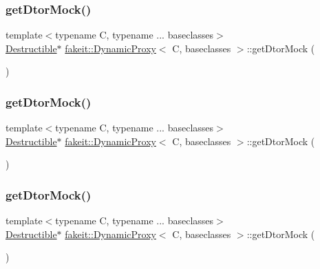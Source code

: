 \subsubsection{\texorpdfstring{getDtorMock()}{getDtorMock()}\hspace{0.1cm}{\footnotesize\ttfamily [4/9]}}
{\footnotesize\ttfamily template$<$typename C, typename ... baseclasses$>$ \\
\mbox{\hyperlink{classfakeit_1_1Destructible}{Destructible}}$\ast$ \mbox{\hyperlink{structfakeit_1_1DynamicProxy}{fakeit\+::\+Dynamic\+Proxy}}$<$ C, baseclasses $>$\+::get\+Dtor\+Mock (\begin{DoxyParamCaption}{ }\end{DoxyParamCaption})\hspace{0.3cm}{\ttfamily [inline]}}

\mbox{\label{structfakeit_1_1DynamicProxy_a32f8a09734ef6d70162d682fd593707b}} 
\subsubsection{\texorpdfstring{getDtorMock()}{getDtorMock()}\hspace{0.1cm}{\footnotesize\ttfamily [5/9]}}
{\footnotesize\ttfamily template$<$typename C, typename ... baseclasses$>$ \\
\mbox{\hyperlink{classfakeit_1_1Destructible}{Destructible}}$\ast$ \mbox{\hyperlink{structfakeit_1_1DynamicProxy}{fakeit\+::\+Dynamic\+Proxy}}$<$ C, baseclasses $>$\+::get\+Dtor\+Mock (\begin{DoxyParamCaption}{ }\end{DoxyParamCaption})\hspace{0.3cm}{\ttfamily [inline]}}

\mbox{\label{structfakeit_1_1DynamicProxy_a32f8a09734ef6d70162d682fd593707b}} 
\subsubsection{\texorpdfstring{getDtorMock()}{getDtorMock()}\hspace{0.1cm}{\footnotesize\ttfamily [6/9]}}
{\footnotesize\ttfamily template$<$typename C, typename ... baseclasses$>$ \\
\mbox{\hyperlink{classfakeit_1_1Destructible}{Destructible}}$\ast$ \mbox{\hyperlink{structfakeit_1_1DynamicProxy}{fakeit\+::\+Dynamic\+Proxy}}$<$ C, baseclasses $>$\+::get\+Dtor\+Mock (\begin{DoxyParamCaption}{ }\end{DoxyParamCaption})\hspace{0.3cm}{\ttfamily [inline]}}

